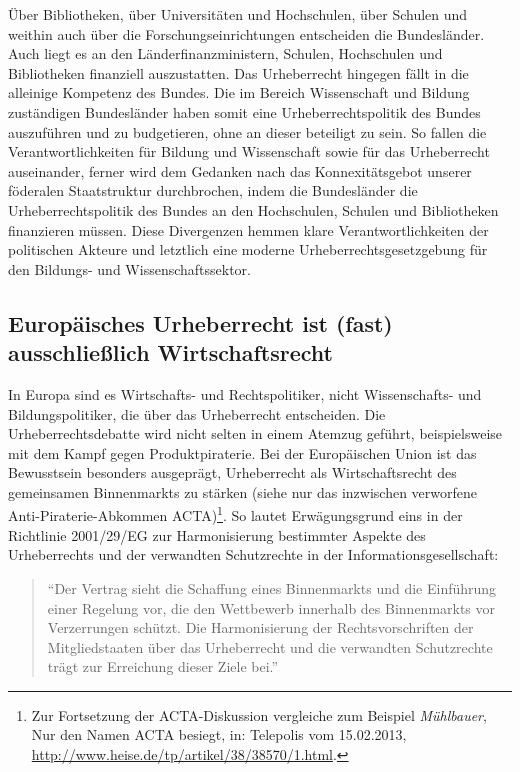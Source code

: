 \documentclass[output=paper]{langscibook}
\begin{document}
Über Bibliotheken, über Universitäten und Hochschulen, über Schulen und
weithin auch über die Forschungseinrichtungen entscheiden die
Bundesländer. Auch liegt es an den Länderfinanzministern, Schulen,
Hochschulen und Bibliotheken finanziell auszustatten. Das Urheberrecht
hingegen fällt in die alleinige Kompetenz des Bundes. Die im Bereich
Wissenschaft und Bildung zuständigen Bundesländer haben somit eine
Urheberrechtspolitik des Bundes auszuführen und zu budgetieren, ohne an
dieser beteiligt zu sein. So fallen die Verantwortlichkeiten für Bildung
und Wissenschaft sowie für das Urheberrecht auseinander, ferner wird dem
Gedanken nach das Konnexitätsgebot unserer föderalen Staatstruktur
durchbrochen, indem die Bundesländer die Urheberrechtspolitik des Bundes
an den Hochschulen, Schulen und Bibliotheken finanzieren müssen. Diese
Divergenzen hemmen klare Verantwortlichkeiten der politischen Akteure
und letztlich eine moderne Urheberrechtsgesetzgebung für den Bildungs-
und Wissenschaftssektor.

\hypertarget{europuxe4isches-urheberrecht-ist-fast-ausschlieuxdflich-wirtschaftsrecht}{%
\subsection{Europäisches Urheberrecht ist (fast) ausschließlich
Wirtschaftsrecht}\label{europuxe4isches-urheberrecht-ist-fast-ausschlieuxdflich-wirtschaftsrecht}}

In Europa sind es Wirtschafts- und Rechtspolitiker, nicht Wissenschafts-
und Bildungspolitiker, die über das Urheberrecht entscheiden. Die
Urheberrechtsdebatte wird nicht selten in einem Atemzug geführt,
beispielsweise mit dem Kampf gegen Produktpiraterie. Bei der
Europäischen Union ist das Bewusstsein besonders ausgeprägt,
Urheberrecht als Wirtschaftsrecht des gemeinsamen Binnenmarkts zu
stärken (siehe nur das inzwischen verworfene Anti-Piraterie-Abkommen
ACTA)\footnote{Zur Fortsetzung der ACTA-Diskussion vergleiche zum Beispiel
  \emph{Mühlbauer}, Nur den Namen ACTA besiegt, in: Telepolis vom
  15.02.2013, \url{http://www.heise.de/tp/artikel/38/38570/1.html}.}. So
lautet Erwägungsgrund eins in der Richtlinie 2001/29/EG zur
Harmonisierung bestimmter Aspekte des Urheberrechts und der verwandten
Schutzrechte in der Informationsgesellschaft:

\begin{quote}
\enquote{Der Vertrag sieht die Schaffung eines Binnenmarkts und die
Einführung einer Regelung vor, die den Wettbewerb innerhalb des
Binnenmarkts vor Verzerrungen schützt. Die Harmonisierung der
Rechtsvorschriften der Mitgliedstaaten über das Urheberrecht und die
verwandten Schutzrechte trägt zur Erreichung dieser Ziele bei.}
\end{quote}
\end{document}
